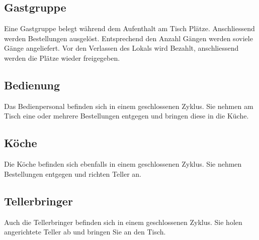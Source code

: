 \documentclass[ngerman,a4paper,12pt]{scrreprt}
\begin{document}
		\subsection{Gastgruppe}
		Eine Gastgruppe belegt während dem Aufenthalt am Tisch Plätze. Anschliessend werden Bestellungen ausgelöst.
		Entsprechend den Anzahl Gängen werden soviele Gänge angeliefert.
		Vor den Verlassen des Lokals wird Bezahlt, anschliessend werden die Plätze wieder freigegeben.
		
		\subsection{Bedienung}
		Das Bedienpersonal befinden sich in einem geschlossenen Zyklus. Sie nehmen am Tisch eine oder mehrere Bestellungen entgegen und bringen diese in die Küche.
		
		\subsection{Köche}
		Die Köche befinden sich ebenfalls in einem geschlossenen Zyklus. Sie nehmen Bestellungen entgegen und richten Teller an.
		
		\subsection{Tellerbringer}
		Auch die Tellerbringer befinden sich in einem geschlossenen Zyklus. Sie holen angerichtete Teller ab und bringen Sie an den Tisch.
		
\end{document}
